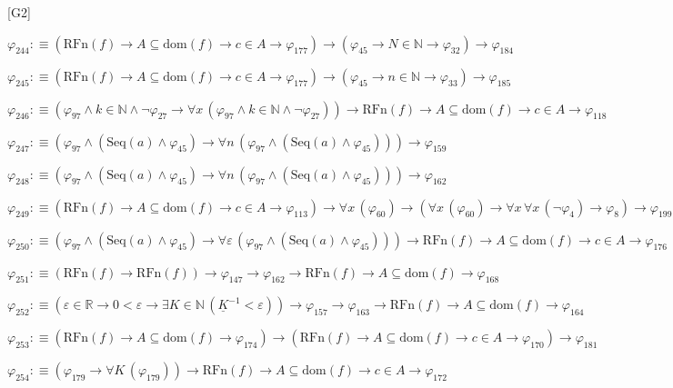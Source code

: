 \begin{fullproof}{[G2]}
\begin{abbrevlist}
\item $\varphi_{244} :\equiv (\mathrm{RFn}(f) \to A \subseteq \mathrm{dom}(f) \to c \in A \to \varphi_{177}) \to (\varphi_{45} \to N \in \mathbb{N} \to \varphi_{32}) \to \varphi_{184}$
\item $\varphi_{245} :\equiv (\mathrm{RFn}(f) \to A \subseteq \mathrm{dom}(f) \to c \in A \to \varphi_{177}) \to (\varphi_{45} \to n \in \mathbb{N} \to \varphi_{33}) \to \varphi_{185}$
\item $\varphi_{246} :\equiv (\varphi_{97} \land k \in \mathbb{N} \land \neg \varphi_{27} \to \forall x\,(\varphi_{97} \land k \in \mathbb{N} \land \neg \varphi_{27})) \to \mathrm{RFn}(f) \to A \subseteq \mathrm{dom}(f) \to c \in A \to \varphi_{118}$
\item $\varphi_{247} :\equiv (\varphi_{97} \land (\mathrm{Seq}(a) \land \varphi_{45}) \to \forall n\,(\varphi_{97} \land (\mathrm{Seq}(a) \land \varphi_{45}))) \to \varphi_{159}$
\item $\varphi_{248} :\equiv (\varphi_{97} \land (\mathrm{Seq}(a) \land \varphi_{45}) \to \forall n\,(\varphi_{97} \land (\mathrm{Seq}(a) \land \varphi_{45}))) \to \varphi_{162}$
\item $\varphi_{249} :\equiv (\mathrm{RFn}(f) \to A \subseteq \mathrm{dom}(f) \to c \in A \to \varphi_{113}) \to \forall x\,(\varphi_{60}) \to (\forall x\,(\varphi_{60}) \to \forall x\,\forall x\,(\neg \varphi_{4}) \to \varphi_{8}) \to \varphi_{199}$
\item $\varphi_{250} :\equiv (\varphi_{97} \land (\mathrm{Seq}(a) \land \varphi_{45}) \to \forall \varepsilon\,(\varphi_{97} \land (\mathrm{Seq}(a) \land \varphi_{45}))) \to \mathrm{RFn}(f) \to A \subseteq \mathrm{dom}(f) \to c \in A \to \varphi_{176}$
\item $\varphi_{251} :\equiv (\mathrm{RFn}(f) \to \mathrm{RFn}(f)) \to \varphi_{147} \to \varphi_{162} \to \mathrm{RFn}(f) \to A \subseteq \mathrm{dom}(f) \to \varphi_{168}$
\item $\varphi_{252} :\equiv (\varepsilon \in \mathbb{R} \to 0 < \varepsilon \to \exists K \in \mathbb{N}\,(\underline{K}^{-1} < \varepsilon)) \to \varphi_{157} \to \varphi_{163} \to \mathrm{RFn}(f) \to A \subseteq \mathrm{dom}(f) \to \varphi_{164}$
\item $\varphi_{253} :\equiv (\mathrm{RFn}(f) \to A \subseteq \mathrm{dom}(f) \to \varphi_{174}) \to (\mathrm{RFn}(f) \to A \subseteq \mathrm{dom}(f) \to c \in A \to \varphi_{170}) \to \varphi_{181}$
\item $\varphi_{254} :\equiv (\varphi_{179} \to \forall K\,(\varphi_{179})) \to \mathrm{RFn}(f) \to A \subseteq \mathrm{dom}(f) \to c \in A \to \varphi_{172}$

\end{abbrevlist}
\end{fullproof}

